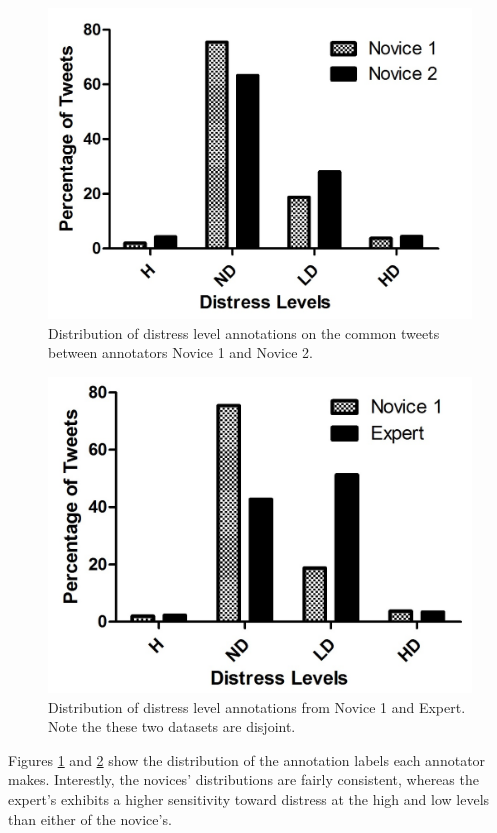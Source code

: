 \documentclass[11pt]{article}
\begin{document}
\begin{figure}
\centering
\includegraphics[scale=0.7]{ChrisCissi4cat.jpg}
\caption{Distribution of distress level annotations on the common tweets between annotators Novice 1 and Novice 2.}
\label{fig:distress-distrib1}
\end{figure}

\begin{figure}
\centering
\includegraphics[scale=0.7]{ChrisMegan4Cat.jpg}
\caption{Distribution of distress level annotations from Novice 1 and Expert. Note the these two datasets are disjoint.}
\label{fig:distress-distrib2}
\end{figure}

Figures \ref{fig:distress-distrib1} and \ref{fig:distress-distrib2} show the distribution of the annotation labels each annotator makes. Interestly, the novices' distributions are fairly consistent, whereas the expert's exhibits a higher sensitivity toward distress at the high and low levels than either of the novice's.  
\end{document}
